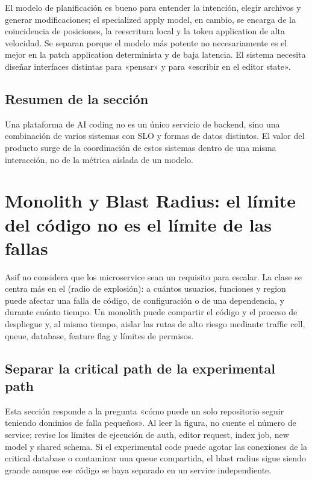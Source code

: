 \documentclass[a4paper]{article}
\begin{document}
El modelo de planificación es bueno para entender la intención, elegir archivos y generar modificaciones; el specialized apply model, en cambio, se encarga de la coincidencia de posiciones, la reescritura local y la token application de alta velocidad. Se separan porque el modelo más potente no necesariamente es el mejor en la patch application determinista y de baja latencia. El sistema necesita diseñar interfaces distintas para «pensar» y para «escribir en el editor state».


\subsection{Resumen de la sección}

Una plataforma de AI coding no es un único servicio de backend, sino una combinación de varios sistemas con SLO y formas de datos distintos. El valor del producto surge de la coordinación de estos sistemas dentro de una misma interacción, no de la métrica aislada de un modelo.
\section{Monolith y Blast Radius: el límite del código no es el límite de las fallas}

Asif no considera que los microservice sean un requisito para escalar. La clase se centra más en el  (radio de explosión): a cuántos usuarios, funciones y region puede afectar una falla de código, de configuración o de una dependencia, y durante cuánto tiempo. Un monolith puede compartir el código y el proceso de despliegue y, al mismo tiempo, aislar las rutas de alto riesgo mediante traffic cell, queue, database, feature flag y límites de permisos.

\subsection{Separar la critical path de la experimental path}

Esta sección responde a la pregunta «cómo puede un solo repositorio seguir teniendo dominios de falla pequeños». Al leer la figura, no cuente el número de service; revise los límites de ejecución de auth, editor request, index job, new model y shared schema. Si el experimental code puede agotar las conexiones de la critical database o contaminar una queue compartida, el blast radius sigue siendo grande aunque ese código se haya separado en un service independiente.
\end{document}
